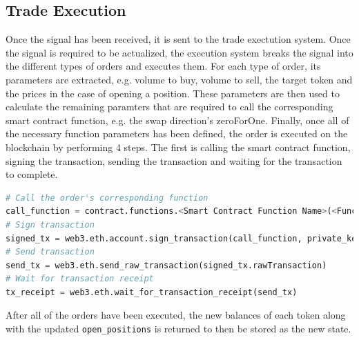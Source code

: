 \subsection{Trade Execution}
Once the signal has been received, it is sent to the trade exectution system. Once the signal is required to be actualized, the execution system breaks the signal into the different types of orders and executes them. For each type of order, its parameters are extracted, e.g. volume to buy, volume to sell, the target token and the prices in the case of opening a position. These parameters are then used to calculate the remaining paramters that are required to call the corresponding smart contract function, e.g. the swap direction's zeroForOne. Finally, once all of the necessary function parameters has been defined, the order is executed on the blockchain by performing 4 steps. The first is calling the smart contract function, signing the transaction, sending the transaction and waiting for the transaction to complete.
\begin{lstlisting}[language=Python]
# Call the order's corresponding function
call_function = contract.functions.<Smart Contract Function Name>(<Function Paramters>).buildTransaction({"chainId": Chain_id, "from": caller, "nonce": nonce})
# Sign transaction
signed_tx = web3.eth.account.sign_transaction(call_function, private_key=private_key)
# Send transaction
send_tx = web3.eth.send_raw_transaction(signed_tx.rawTransaction)
# Wait for transaction receipt
tx_receipt = web3.eth.wait_for_transaction_receipt(send_tx)
\end{lstlisting}

\noindent After all of the orders have been executed, the new balances of each token along with the updated \texttt{open\_positions} is returned to then be stored as the new state.

